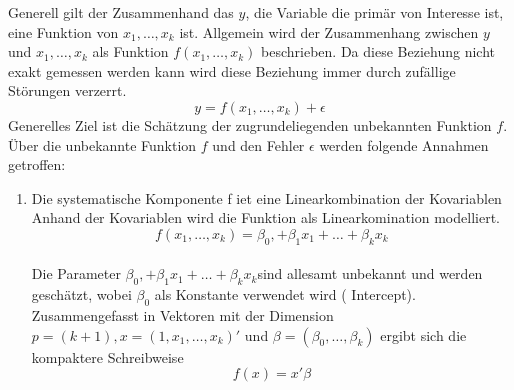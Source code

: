 \documentclass[11pt]{report}
\begin{document}
Generell gilt der Zusammenhand das $y$, die Variable die primär von Interesse ist, eine Funktion von $x_1,\dots,x_k$ ist. Allgemein wird der Zusammenhang zwischen $y$ und $x_1,\dots,x_k$ als Funktion $f(x_1,\dots,x_k)$ beschrieben. Da diese Beziehung nicht exakt gemessen werden kann wird diese Beziehung immer durch zufällige Störungen verzerrt.
\begin{equation}
y=f(x_1,\dots,x_k)+\epsilon
\end{equation}\newline
Generelles Ziel ist die Schätzung der zugrundeliegenden unbekannten Funktion $f$. Über die unbekannte Funktion $f$ und den Fehler $\epsilon$ werden folgende Annahmen getroffen:\newline
\begin{enumerate}
\item Die systematische Komponente f iet eine Linearkombination der Kovariablen\\
Anhand der Kovariablen wird die Funktion als Linearkomination modelliert.
\begin{equation}
f(x_1,\dots,x_k) = \beta_0, + \beta_1 x_1 +  \dots + \beta_k x_k
\end{equation}\\
Die Parameter $\beta_0, + \beta_1 x_1 +  \dots + \beta_k x_k $sind allesamt unbekannt und werden geschätzt, wobei $\beta_0$ als Konstante verwendet wird ( Intercept). Zusammengefasst in Vektoren mit der Dimension $p=(k+1) , x=(1,x_1,\dots,x_k)'$ und $\beta=(\beta_0,\dots,\beta_k)$ ergibt sich die kompaktere Schreibweise
\begin{equation}
f(x) = x'\beta
\end{equation}


\end{enumerate}
\end{document}
